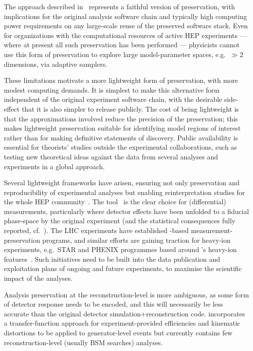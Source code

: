 \documentclass[11pt]{article}
\begin{document}
The approach described in~ represents a faithful version of preservation, with implications for the original analysis software chain and typically high computing power requirements on any large-scale reuse of the preserved software stack. Even for organizations with the computational resources of active \gls{HEP} experiments --- where at present all such preservation has been performed --- physicists cannot use this form of preservation to explore large model-parameter spaces, e.g.~$\gg 2$ dimensions, via adaptive samplers.

These limitations motivate a more lightweight form of preservation, with more modest computing demands. It is simplest to make this alternative form independent of the original experiment software chain, with the desirable side-effect that it is also simpler to release publicly. The cost of being lightweight is that the approximations involved reduce the precision of the preservation; this makes lightweight preservation suitable for identifying model regions of interest rather than for making definitive statements of discovery. Public availability is essential for theorists' studies outside the experimental collaborations, such as testing new theoretical ideas against the data from several analyses and experiments in a global approach.

Several lightweight frameworks have arisen, ensuring not only preservation and reproducibility of experimental analyses but enabling \gls{reinterpretation} studies for the whole \gls{HEP} community~\cite{LHCReinterpretationForum:2020xtr}. The \rivet tool~\cite{Bierlich:2019rhm} is the clear choice for (differential) measurements, particularly where detector effects have been unfolded to a fiducial phase-space by the original experiment (and the statistical consequences fully reported, cf.~). The \gls{LHC} experiments have established \rivet-based measurement-preservation programs, and similar efforts are gaining traction for heavy-ion experiments, e.g.~\gls{STAR} and \gls{PHENIX} programmes based around \rivet's heavy-ion features~\cite{Bierlich:2020wms}. Such initiatives need to be built into the data publication and exploitation plans of ongoing and future experiments, to maximise the scientific impact of the analyses.

Analysis preservation at the reconstruction-level is more ambiguous, as some form of detector response needs to be encoded, and this will necessarily be less accurate than the original detector simulation+reconstruction code.
\rivet incorporates a transfer-function approach for experiment-provided efficiencies and kinematic distortions to be applied to generator-level events but currently contains few reconstruction-level (usually \gls{BSM} searches) analyses.
\end{document}
